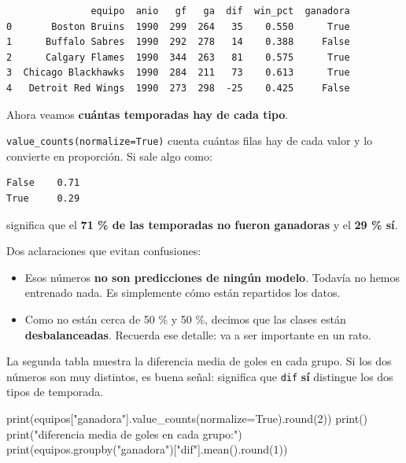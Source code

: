 \documentclass[
]{article}
\newenvironment{Shaded}{}{}
\newcommand{\BuiltInTok}[1]{\textcolor[rgb]{0.00,0.50,0.00}{#1}}
\newcommand{\DecValTok}[1]{\textcolor[rgb]{0.25,0.63,0.44}{#1}}
\newcommand{\NormalTok}[1]{#1}
\newcommand{\OperatorTok}[1]{\textcolor[rgb]{0.40,0.40,0.40}{#1}}
\newcommand{\StringTok}[1]{\textcolor[rgb]{0.25,0.44,0.63}{#1}}
\newcommand{\VariableTok}[1]{\textcolor[rgb]{0.10,0.09,0.49}{#1}}
\providecommand{\tightlist}{%
  \setlength{\itemsep}{0pt}\setlength{\parskip}{0pt}}
\begin{document}
\begin{verbatim}
               equipo  anio   gf   ga  dif  win_pct  ganadora
0       Boston Bruins  1990  299  264   35    0.550      True
1      Buffalo Sabres  1990  292  278   14    0.388     False
2      Calgary Flames  1990  344  263   81    0.575      True
3  Chicago Blackhawks  1990  284  211   73    0.613      True
4   Detroit Red Wings  1990  273  298  -25    0.425     False
\end{verbatim}

\protect{}\label{e22f6750}
Ahora veamos \textbf{cuántas temporadas hay de cada tipo}.

\texttt{value\_counts(normalize=True)} cuenta cuántas filas hay de cada
valor y lo convierte en proporción. Si sale algo como:

\begin{verbatim}
False    0.71
True     0.29
\end{verbatim}

significa que el \textbf{71 \% de las temporadas no fueron ganadoras} y
el \textbf{29 \% sí}.

Dos aclaraciones que evitan confusiones:

\begin{itemize}
\tightlist
\item
  Esos números \textbf{no son predicciones de ningún modelo}. Todavía no
  hemos entrenado nada. Es simplemente cómo están repartidos los datos.
\item
  Como no están cerca de 50 \% y 50 \%, decimos que las clases están
  \textbf{desbalanceadas}. Recuerda ese detalle: va a ser importante en
  un rato.
\end{itemize}

La segunda tabla muestra la diferencia media de goles en cada grupo. Si
los dos números son muy distintos, es buena señal: significa que
\texttt{dif} \textbf{sí} distingue los dos tipos de temporada.

\protect{}\label{e722cc47}
\begin{Shaded}
\begin{Highlighting}[]
\BuiltInTok{print}\NormalTok{(equipos[}\StringTok{"ganadora"}\NormalTok{].value\_counts(normalize}\OperatorTok{=}\VariableTok{True}\NormalTok{).}\BuiltInTok{round}\NormalTok{(}\DecValTok{2}\NormalTok{))}
\BuiltInTok{print}\NormalTok{()}
\BuiltInTok{print}\NormalTok{(}\StringTok{"diferencia media de goles en cada grupo:"}\NormalTok{)}
\BuiltInTok{print}\NormalTok{(equipos.groupby(}\StringTok{"ganadora"}\NormalTok{)[}\StringTok{"dif"}\NormalTok{].mean().}\BuiltInTok{round}\NormalTok{(}\DecValTok{1}\NormalTok{))}
\end{Highlighting}
\end{Shaded}
\end{document}
